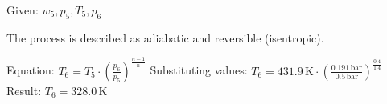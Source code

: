 Given:  
\( w_5, p_5, T_5, p_6 \)  

The process is described as adiabatic and reversible (isentropic).  

Equation:  
\( T_6 = T_5 \cdot \left( \frac{p_6}{p_5} \right)^{\frac{n-1}{n}} \)  
Substituting values:  
\( T_6 = 431.9 \, \text{K} \cdot \left( \frac{0.191 \, \text{bar}}{0.5 \, \text{bar}} \right)^{\frac{0.4}{1.4}} \)  
Result:  
\( T_6 = 328.0 \, \text{K} \)